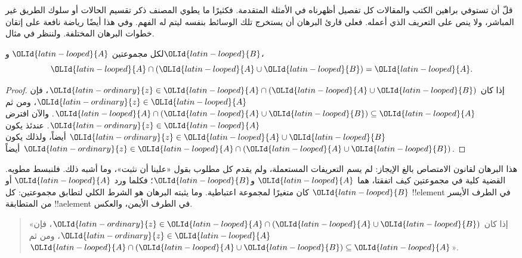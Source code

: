 \documentclass[../../../include/open-logic-section]{subfiles}
\begin{document}

قلّ أن تستوفي براهين الكتب والمقالات كل تفصيل أظهرناه في الأمثلة
المتقدمة. فكثيرًا ما يطوي المصنف ذكر تقسيم الحالات أو سلوك الطريق
غير المباشر، ولا ينص على التعريف الذي أعمله. فعلى قارئ البرهان أن
يستخرج تلك الوسائط بنفسه ليتم له الفهم. وفي هذا أيضًا رياضة نافعة على
إتقان خطوات البرهان المختلفة. ولننظر في مثال.

\begin{prop}[الامتصاص]
لكل مجموعتين $\OLId{latin-looped}{A}$ و$\OLId{latin-looped}{B}$،
\[
\OLId{latin-looped}{A} \cap (\OLId{latin-looped}{A} \cup \OLId{latin-looped}{B}) = \OLId{latin-looped}{A}.
\]
\end{prop}

\begin{proof}
إذا كان $\OLId{latin-ordinary}{z} \in \OLId{latin-looped}{A} \cap (\OLId{latin-looped}{A} \cup \OLId{latin-looped}{B})$، فإن $\OLId{latin-ordinary}{z} \in \OLId{latin-looped}{A}$، ومن ثم
$\OLId{latin-looped}{A} \cap (\OLId{latin-looped}{A} \cup \OLId{latin-looped}{B}) \subseteq \OLId{latin-looped}{A}$. والآن افترض $\OLId{latin-ordinary}{z} \in \OLId{latin-looped}{A}$. عندئذ يكون
$\OLId{latin-ordinary}{z} \in \OLId{latin-looped}{A} \cup \OLId{latin-looped}{B}$ أيضاً، ولذلك يكون $\OLId{latin-ordinary}{z} \in \OLId{latin-looped}{A} \cap (\OLId{latin-looped}{A} \cup \OLId{latin-looped}{B})$ أيضاً.
\end{proof}

هذا البرهان لقانون الامتصاص بالغ الإيجاز: لم يسم التعريفات المستعملة،
ولم يقدم كل مطلوب بقول «علينا أن نثبت»، وما أشبه ذلك. فلنبسط مطويه.
القضية كلية في مجموعتين كيف اتفقتا، هما $\OLId{latin-looped}{A}$ و$\OLId{latin-looped}{B}$؛ فكلما ورد $\OLId{latin-looped}{A}$ أو
$\OLId{latin-looped}{B}$ كان متغيرًا لمجموعة اعتباطية. وما يثبته البرهان هو الشرط الكلي
لتطابق مجموعتين: كل !!{element} في الطرف الأيسر من المتطابقة
!!a{element} في الطرف الأيمن، والعكس.

\begin{quote}
«إذا كان $\OLId{latin-ordinary}{z} \in \OLId{latin-looped}{A} \cap (\OLId{latin-looped}{A} \cup \OLId{latin-looped}{B})$، فإن $\OLId{latin-ordinary}{z} \in \OLId{latin-looped}{A}$، ومن ثم
$\OLId{latin-looped}{A} \cap (\OLId{latin-looped}{A} \cup \OLId{latin-looped}{B}) \subseteq \OLId{latin-looped}{A}$».
\end{quote}
\end{document}
